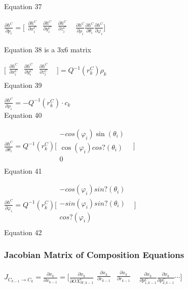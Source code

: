 Equation 37



\begin{center}$\frac{\partial h^{C}}{\partial p_{i}}=\lbrack 
\begin{matrix}
\frac{\partial h^{C}}{\partial x_{i}^{C}} & \frac{\partial 
h^{C}}{\partial y_{i}^{C}} & \frac{\partial h^{C}}{\partial z_{i}^{C}} & 
\\
\end{matrix}
\frac{\partial h^{C}}{\partial \rho _{i}}\frac{\partial h^{C}}{\partial 
\theta _{i}}\frac{\partial h^{C}}{\partial \varphi _{i}}\rbrack $\\
\end{center}

Equation 38 is a 3x6 matrix

$\lbrack \begin{matrix}
\frac{\partial h^{C}}{\partial x_{i}^{C}} & \frac{\partial 
h^{C}}{\partial y_{i}^{C}} & \frac{\partial h^{C}}{\partial z_{i}^{C}} & 
\\
\end{matrix}
\rbrack =Q^{-1}(r_{k}^{C})\rho _{k}$\\


Equation 39

$\frac{\partial h^{C}}{\partial \rho _{i}}=-Q^{-1}(r_{k}^{C})\cdot 
c_{k}$\\


Equation 40

$\frac{\partial h^{C}}{\partial \theta _{i}}=Q^{-1}(r_{k}^{C})\lbrack 
\begin{matrix}
-cos(\varphi _{i})\sin (\theta _{i}) & \\
\cos (\varphi _{i})cos?(\theta _{i}) & \\
0 & \\
\end{matrix}
\rbrack $\\


Equation 41

$\frac{\partial h^{C}}{\partial \varphi _{i}}= Q^{-1}(r_{k}^{C})\lbrack 
\begin{matrix}
-cos(\varphi _{i})sin?(\theta _{i}) & \\
-sin(\varphi _{i})sin?(\theta _{i}) & \\
cos?(\varphi _{i}) & \\
\end{matrix}
\rbrack $\\


Equation 42

\subsubsection{Jacobian Matrix of Composition Equations}
$J_{C_{k-1}\to C_{k}}=\frac{\partial x_{k}}{\partial x_{k-1}}=\lbrack 
\frac{\partial x_{k}}{\partial OX_{W, k-1}^{C}}\begin{matrix}
\frac{\partial x_{k}}{\partial c_{k-1}} & \frac{\partial x_{k}}{\partial 
r_{k-1}} & \\
\end{matrix}
\frac{\partial x_{k}}{\partial p_{1, k-1}^{C}}\frac{\partial 
x_{k}}{\partial p_{2, k-1}^{C}} \cdots \rbrack $\\


